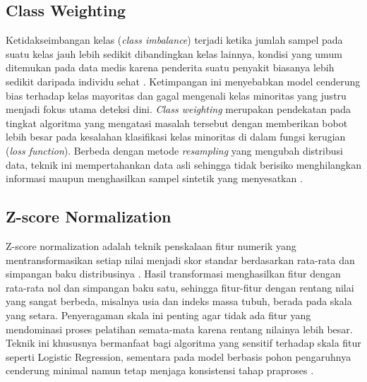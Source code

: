 \subsection{Class Weighting}
Ketidakseimbangan kelas (\emph{class imbalance}) terjadi ketika jumlah sampel pada suatu kelas jauh lebih sedikit dibandingkan kelas lainnya, kondisi yang umum ditemukan pada data medis karena penderita suatu penyakit biasanya lebih sedikit daripada individu sehat \autocite{he2009}. Ketimpangan ini menyebabkan model cenderung bias terhadap kelas mayoritas dan gagal mengenali kelas minoritas yang justru menjadi fokus utama deteksi dini. \emph{Class weighting} merupakan pendekatan pada tingkat algoritma yang mengatasi masalah tersebut dengan memberikan bobot lebih besar pada kesalahan klasifikasi kelas minoritas di dalam fungsi kerugian (\emph{loss function}). Berbeda dengan metode \emph{resampling} yang mengubah distribusi data, teknik ini mempertahankan data asli sehingga tidak berisiko menghilangkan informasi maupun menghasilkan sampel sintetik yang menyesatkan \autocite{krawczyk2016}.

\subsection{Z-score Normalization}
Z-score normalization adalah teknik penskalaan fitur numerik yang mentransformasikan setiap nilai menjadi skor standar berdasarkan rata-rata dan simpangan baku distribusinya \autocite{Patro2015Normalization}. Hasil transformasi menghasilkan fitur dengan rata-rata nol dan simpangan baku satu, sehingga fitur-fitur dengan rentang nilai yang sangat berbeda, misalnya usia dan indeks massa tubuh, berada pada skala yang setara. Penyeragaman skala ini penting agar tidak ada fitur yang mendominasi proses pelatihan semata-mata karena rentang nilainya lebih besar. Teknik ini khususnya bermanfaat bagi algoritma yang sensitif terhadap skala fitur seperti Logistic Regression, sementara pada model berbasis pohon pengaruhnya cenderung minimal namun tetap menjaga konsistensi tahap praproses \autocite{Patro2015Normalization}.

